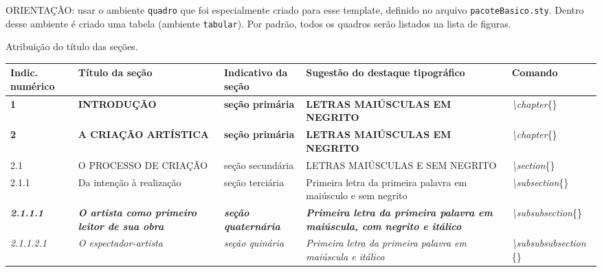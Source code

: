 \documentclass[
  12pt,		%
  a4paper,	%
  openright,  %
  oneside,	%
  chapter=TITLE,		%
  section=TITLE,		%
  english,	%
  french,	    %
  spanish,	%
  brazil	    %
]{abntex2}
\begin{document}
               ORIENTAÇÃO: usar o  ambiente \verb|quadro| que foi especialmente criado para esse template, definido no arquivo \verb|pacoteBasico.sty|. Dentro desse ambiente é criado uma tabela (ambiente \verb|tabular|). Por padrão, todos os quadros serão listados na lista de figuras.
        \begin{quadro}[H]
        \centering
        \caption{Atribuição do título das seções.}
            \begin{tabularx}{\columnwidth}{|X|X|X|X|X|}
            \hline
            Indic. numérico & Título da seção & Indicativo da seção & Sugestão do destaque tipográfico & Comando \\ \hline
            
            \textbf{1} & \textbf{INTRODUÇÃO} & \textbf{seção primária} & \textbf{LETRAS MAIÚSCULAS EM NEGRITO} & \textit{\textbackslash chapter}\{\} \\ \hline

            \textbf{2} & \textbf{A CRIAÇÃO ARTÍSTICA} & \textbf{seção primária} & \textbf{LETRAS MAIÚSCULAS EM NEGRITO} & \textit{\textbackslash chapter}\{\} \\ \hline

            2.1 & O PROCESSO DE CRIAÇÃO & seção secundária & LETRAS MAIÚSCULAS E SEM NEGRITO  & \textit{\textbackslash section}\{\} \\ \hline %

            2.1.1 & Da intenção à realização & seção terciária & Primeira letra da   primeira palavra em maiúsculo e sem negrito & \textit{\textbackslash subsection}\{\} \\ \hline

            \textit{\textbf{2.1.1.1}} & \textit{\textbf{O artista como primeiro leitor de sua obra}} & \textit{\textbf{seção quaternária}} & \textit{\textbf{Primeira letra da primeira palavra em maiúscula, com negrito e itálico}} & \textit{\textbackslash subsubsection}\{\} \\ \hline

            \textit{2.1.1.2.1} & \textit{O espectador-artista} & \textit{seção quinária} & \textit{Primeira letra da primeira palavra em maiúscula e itálico} & \textit{\textbackslash subsubsubsection} \{\} \\ \hline


\end{tabularx}
\end{quadro}
\end{document}
